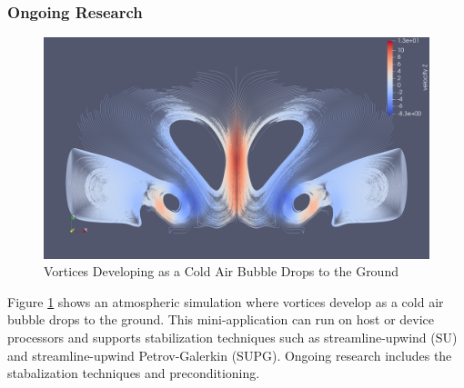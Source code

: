 \subsubsection{Ongoing Research}
\begin{figure}[ht!]
\includegraphics[width=.99\linewidth]{../img/Vortices}
\caption{Vortices Developing as a Cold Air Bubble Drops to the Ground}
\label{fig:vortices}
\end{figure}

Figure \ref{fig:vortices} shows an atmospheric simulation where vortices develop as a cold air bubble drops to the ground.
This mini-application can run on host or device processors and supports stabilization techniques such as streamline-upwind (SU) and streamline-upwind Petrov-Galerkin (SUPG).
Ongoing research includes the stabalization techniques and preconditioning.